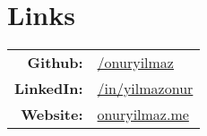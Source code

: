 \section{Links} 
\sectionspacehalf

\begin{tabular}{rl}
{\bf Github:}	& \href{http://github.com/onuryilmaz}{/onuryilmaz} \\
{\bf LinkedIn:}	& \href{http://tr.linkedin.com/in/yilmazonur}{/in/yilmazonur} \\
{\bf Website:}	& \href{http://onuryilmaz.me}{onuryilmaz.me} \\
\end{tabular}

\sectionspacehalf


